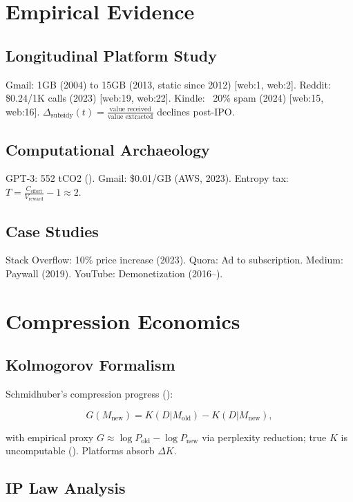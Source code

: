 \documentclass[12pt]{article}
\begin{document}
\section{Empirical Evidence}

\subsection{Longitudinal Platform Study}

Gmail: 1GB (2004) to 15GB (2013, static since 2012) [web:1, web:2]. Reddit: \$0.24/1K calls (2023) [web:19, web:22]. Kindle: ~20\% spam (2024) [web:15, web:16]. \(\Delta_{\text{subsidy}}(t) = \frac{\text{value received}}{\text{value extracted}}\) declines post-IPO.

\subsection{Computational Archaeology}

GPT-3: 552 tCO2 (\citealp{Patterson2021}). Gmail: \$0.01/GB (AWS, 2023). Entropy tax: \(T = \frac{C_{\text{effort}}}{V_{\text{reward}}} - 1 \approx 2\).

\subsection{Case Studies}

Stack Overflow: 10\% price increase (2023). Quora: Ad to subscription. Medium: Paywall (2019). YouTube: Demonetization (2016–).

\section{Compression Economics}

\subsection{Kolmogorov Formalism}

Schmidhuber’s compression progress (\citealp{Schmidhuber2009}):

\[
G(M_{\text{new}}) = K(D | M_{\text{old}}) - K(D | M_{\text{new}}),
\]

with empirical proxy \( G \approx \log P_{\text{old}} - \log P_{\text{new}} \) via perplexity reduction; true \( K \) is uncomputable (\citealp{LiVitanyi2019}). Platforms absorb \(\Delta K\).

\subsection{IP Law Analysis}
\end{document}
